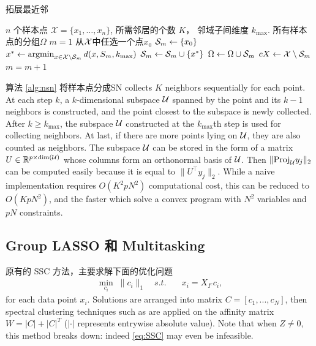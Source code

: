 \documentclass{ctexart}
\begin{document}
\begin{algorithm} \caption{拓展最近邻}
  \begin{algorithmic} \label{alg:nsn}
    \Require $n$ 个样本点 $\mathcal{X} = \{x_1,\ldots,x_n\}$, 所需邻居的个数
    $K$， 邻域子间维度 $k_{\max}$.
    \Ensure 所有样本点的分组$\Omega$
    \State $m=1$
    \Repeat
      \State 从$\mathcal{X}$中任选一个点$x_0$
      \State $\mathcal{S}_m \gets \{x_0\}$ 
       
        \State $x^* \gets \operatorname*{argmin}_{x \in \mathcal{X}  \setminus \mathcal{S}_m} d(x, S_m,
        k_{\max})$
        \State $\mathcal{S}_m \gets \mathcal{S}_m \cup \{x^*\}$
      \EndFor
      \State $\Omega \gets \Omega \cup \mathcal{S}_m$
      \State $cX \gets \mathcal{X} \setminus \mathcal{S}_m$
      \State $m=m+1$
  \end{algorithmic}
\end{algorithm}

算法 \ref{alg:nsn} 将样本点分成SN collects $K$ neighbors sequentially for each point. At each step $k$, a
$k$-dimensional subspace $\mathcal{U}$ spanned by the point and its $k-1$ neighbors
is constructed, and the point closest to the subspace is newly collected. After
$k \ge k_{\max}$, the subspace $\mathcal{U}$ constructed at the $k_{\max}$th step
is used for collecting neighbors. At last, if there are more points lying on
$\mathcal{U}$, they are also counted as neighbors. The subspace $\mathcal{U}$ can be
stored in the form of a matrix $U \in \mathbb{R}^{p \times
  \text{dim}(\mathcal{U})}$ whose columns form an orthonormal basis of $\mathcal{U}$.
  Then $\|\mathrm{Proj}_{\mathcal{U}} y_j\|_2$ can be computed easily because it is equal
  to $\|U^\top y_j\|_2$. While a naive implementation requires $O(K^2pN^2)$
  computational cost, this can be reduced to $O(KpN^2)$, and the faster
  which solve a convex program with $N^2$ variables and $pN$ constraints.

\subsection{Group LASSO 和 Multitasking}
原有的 SSC 方法，主要求解下面的优化问题
\begin{equation}\label{eq:SSC}
  \begin{aligned}
    \min_{c_i} \; \|c_i\|_1 \quad s.t. \quad &x_i=X_{I^c}c_i,
  \end{aligned}
\end{equation}
for each data point $x_i$. Solutions are arranged into matrix $C=[c_1,...,c_N]$, then spectral clustering techniques such as \cite{ng2002spectral} are applied on the affinity matrix $W=|C|+|C|^T$ ($|\cdot|$ represents entrywise absolute value). Note that when $Z\neq 0$, this method breaks down: indeed \eqref{eq:SSC} may even be infeasible.
\end{document}
